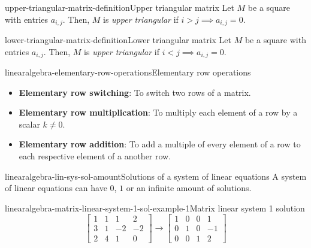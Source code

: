 \documentclass[preview]{standalone}
\begin{document}
\begin{snippetdefinition}{upper-triangular-matrix-definition}{Upper triangular matrix}
    Let \(M\) be a square \matrix with entries \(a_{i,j}\).
    Then, \(M\) is \textit{upper triangular} if \(i > j \implies a_{i,j} = 0\). 
\end{snippetdefinition}

\begin{snippetdefinition}{lower-triangular-matrix-definition}{Lower triangular matrix}
    Let \(M\) be a square \matrix with entries \(a_{i,j}\).
    Then, \(M\) is \textit{upper triangular} if \(i < j \implies a_{i,j} = 0\). 
\end{snippetdefinition}

\begin{snippetdefinition}{linearalgebra-elementary-row-operations}{Elementary row operations}
    \begin{itemize}
        \item \textbf{Elementary row switching}:
        To switch two rows of a matrix.
        \item \textbf{Elementary row multiplication}:
        To multiply each element of a row by
        a scalar \(k \neq 0\).
        \item \textbf{Elementary row addition}:
        To add a multiple of every element of a row
        to each respective element of a another row.
    \end{itemize}

\end{snippetdefinition}

\begin{snippetproposition}{linearalgebra-lin-sys-sol-amount}{Solutions of a system of linear equations}
    A system of linear equations can have \(0\), \(1\)
    or an infinite amount of solutions.
\end{snippetproposition}

\begin{snippetexample}{linearalgebra-matrix-linear-system-1-sol-example-1}{Matrix linear system 1 solution}
    \[
        \begin{bmatrix}
            1 & 1 & 1 & 2 \\
            3 & 1 & -2 & -2 \\
            2 & 4 & 1 & 0
        \end{bmatrix}
        \rightarrow
        \begin{bmatrix}
            1 & 0 & 0 & 1 \\
            0 & 1 & 0 & -1 \\
            0 & 0 & 1 & 2
        \end{bmatrix}
    \]
\end{snippetexample}
\end{document}
